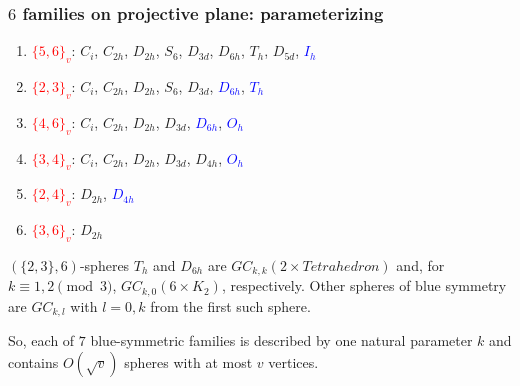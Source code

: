\documentclass{beamer}
\begin{document}
\begin{frame}\frametitle{$6$ families on projective plane: parameterizing}
\begin{enumerate}
\item[\ding{108}]  \textcolor{red}{$\{5,6\}_v$}:
$C_i$, $C_{2h}$, $D_{2h}$, $S_6$, $D_{3d}$, $D_{6h}$,  $T_h$, $D_{5d}$, 
\textcolor{blue}{$I_h$}
\item[\ding{108}]  \textcolor{red}{$\{2, 3\}_v$}:  $C_i$, $C_{2h}$,
  $D_{2h}$, $S_6$, $D_{3d}$, \textcolor{blue}{$D_{6h}$},   \textcolor{blue}{$T_h$}
\item[\ding{108}]  \textcolor{red}{$\{4,6\}_v$}:
$C_{i}$, $C_{2h}$, $D_{2h}$, $D_{3d}$, \textcolor{blue}{$D_{6h}$}, \textcolor{blue}{$O_h$}
\item[\ding{108}]  \textcolor{red}{$\{3, 4\}_v$}:
$C_i$, $C_{2h}$, $D_{2h}$, $D_{3d}$, $D_{4h}$,  \textcolor{blue}{$O_h$}
\item[\ding{108}] \textcolor{red}{$\{2, 4\}_v$}: $D_{2h}$, \textcolor{blue}{$D_{4h}$}
\item[\ding{108}] \textcolor{red}{$\{3,6\}_v$}: $D_{2h}$

\end{enumerate}
\vspace{2mm}\pause
$(\{2, 3\},6)$-spheres $T_h$ and $D_{6h}$   are  
$GC_{k,k}(2\times Tetrahedron)$ and, for $k\equiv 1,2 \pmod 3$,  
$GC_{k,0}(6\times K_2)$, respectively.
Other spheres of blue symmetry are  $GC_{k,l}$ with $l=0,k$ from the first 
such sphere. 
\vspace{1mm}

So, each of $7$ blue-symmetric  families 
is described by one natural parameter $k$
and contains $O(\sqrt{v})$ spheres with at most $v$ vertices.


\end{frame}
\end{document}
